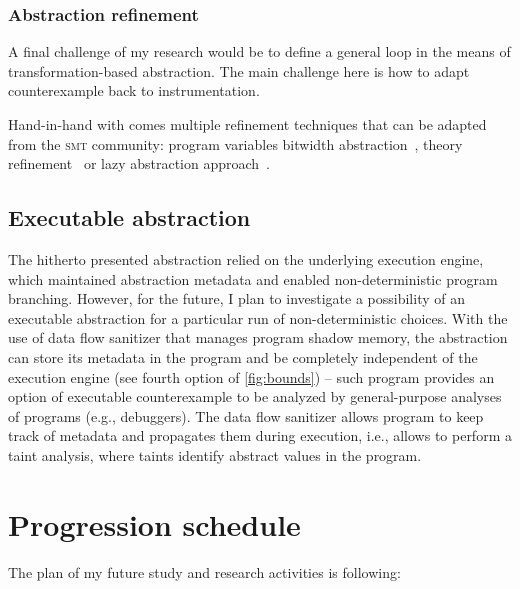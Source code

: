 \subsubsection{Abstraction refinement}


A final challenge of my research would be to define a general \cegar loop in the
means of transformation-based abstraction. The main challenge here is how to
adapt counterexample back to instrumentation.

Hand-in-hand with \cegar comes multiple refinement techniques that can be
adapted from the \textsc{smt} community: program variables bitwidth
abstraction~\cite{Jonavs2018}, theory refinement~\cite{Hyvarinen2017} or lazy
abstraction approach~\cite{Henzinger2002}.

\subsection{Executable abstraction}

The hitherto presented abstraction relied on the underlying execution engine,
which maintained abstraction metadata and enabled non-deter\-mi\-ni\-stic program
branching. However, for the future, I plan to investigate a possibility of an
executable abstraction for a particular run of non-deterministic choices.  With
the use of data flow sanitizer that manages program shadow memory, the
abstraction can store its metadata in the program and be completely independent
of the execution engine (see fourth option of \autoref{fig:bounds}) -- such
program provides an option of executable counterexample to be analyzed by
general-purpose analyses of \llvm programs (e.g., debuggers).  The data flow
sanitizer allows program to keep track of metadata and propagates them during
execution, i.e., allows to perform a taint analysis, where taints identify
abstract values in the program.

\section{Progression schedule}

The plan of my future study and research activities is following:

